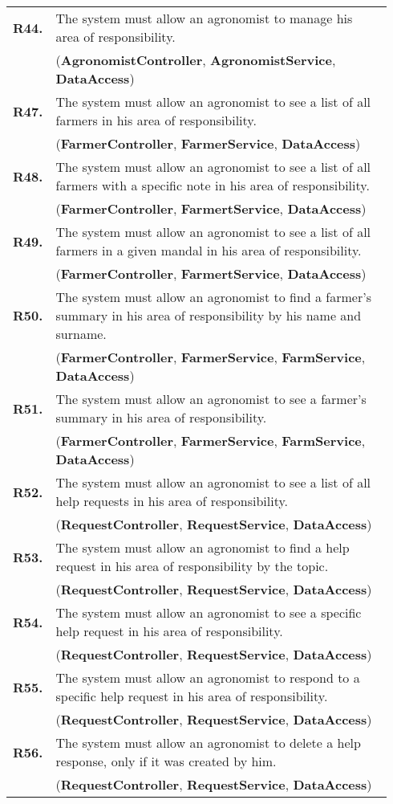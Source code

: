 \begin{longtable}{p{0.06\linewidth} p{0.88\linewidth}}
	\textbf{R44.} & The system must allow an agronomist to manage his area of responsibility.\\
	& (\textbf{AgronomistController}, \textbf{AgronomistService}, \textbf{DataAccess})\\
	\textbf{R47.} & The system must allow an agronomist to see a list of all farmers in his area of responsibility.\\
	& (\textbf{FarmerController}, \textbf{FarmerService}, \textbf{DataAccess})\\
	\textbf{R48.} & The system must allow an agronomist to see a list of all farmers with a specific note in his area of responsibility.\\
	& (\textbf{FarmerController}, \textbf{FarmertService}, \textbf{DataAccess})\\
	\textbf{R49.} & The system must allow an agronomist to see a list of all farmers in a given mandal in his area of responsibility.\\
	& (\textbf{FarmerController}, \textbf{FarmertService}, \textbf{DataAccess})\\
	\textbf{R50.} & The system must allow an agronomist to find a farmer's summary in his area of responsibility by his name and surname.\\
	& (\textbf{FarmerController}, \textbf{FarmerService}, \textbf{FarmService}, \textbf{DataAccess})\\
	\textbf{R51.} & The system must allow an agronomist to see a farmer's summary in his area of responsibility.\\
	& (\textbf{FarmerController}, \textbf{FarmerService}, \textbf{FarmService}, \textbf{DataAccess})\\
	\textbf{R52.} & The system must allow an agronomist to see a list of all help requests in his area of responsibility.\\
	& (\textbf{RequestController}, \textbf{RequestService}, \textbf{DataAccess})\\
	\textbf{R53.} & The system must allow an agronomist to find a help request in his area of responsibility by the topic.\\
	& (\textbf{RequestController}, \textbf{RequestService}, \textbf{DataAccess})\\
	\textbf{R54.} & The system must allow an agronomist to see a specific help request in his area of responsibility.\\
	& (\textbf{RequestController}, \textbf{RequestService}, \textbf{DataAccess})\\
	\textbf{R55.} & The system must allow an agronomist to respond to a specific help request in his area of responsibility.\\
	& (\textbf{RequestController}, \textbf{RequestService}, \textbf{DataAccess})\\
	\textbf{R56.} & The system must allow an agronomist to delete a help response, only if it was created by him.\\
	& (\textbf{RequestController}, \textbf{RequestService}, \textbf{DataAccess})\\


\end{longtable}
